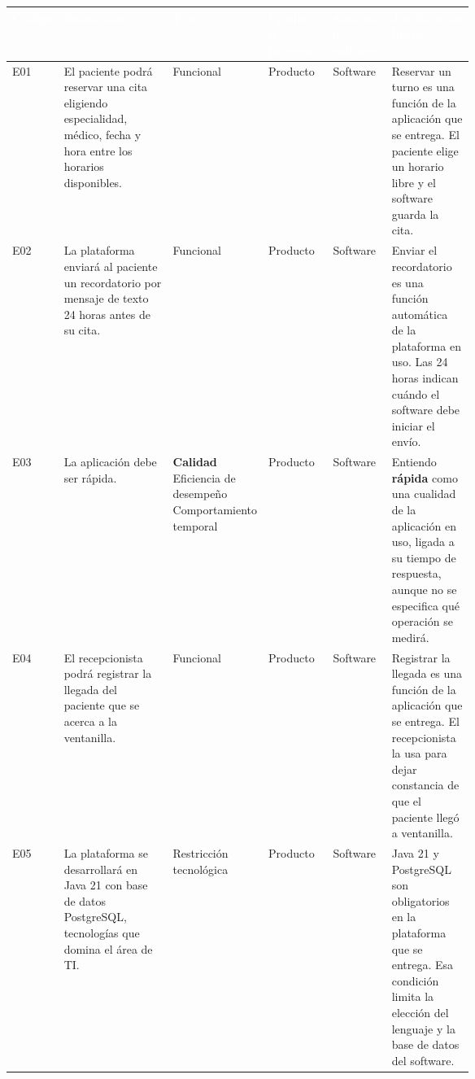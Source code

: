 \documentclass[11pt,a4paper]{article}
\newcommand{\cabeceraTabla}[1]{\textcolor{white}{\textbf{#1}}}
\begin{document}
{\small
\setlength{\tabcolsep}{4pt}
\renewcommand{\arraystretch}{1.1}
\begin{longtable}
  {|>{\raggedright\arraybackslash}p{0.07\linewidth}
   |>{\raggedright\arraybackslash}p{0.24\linewidth}
   |>{\raggedright\arraybackslash}p{0.155\linewidth}
   |>{\raggedright\arraybackslash}p{0.095\linewidth}
   |>{\raggedright\arraybackslash}p{0.10\linewidth}
   |>{\raggedright\arraybackslash}p{}|}
  \hline
  \rowcolor{VerdeTabla}
  \cabeceraTabla{Código} & \cabeceraTabla{Enunciado} & \cabeceraTabla{Tipo} &
  \cabeceraTabla{Producto o proceso} & \cabeceraTabla{Sistema o software} &
  \cabeceraTabla{Justificación breve} \\ \hline
  \endhead

  E01 & El paciente podrá reservar una cita eligiendo especialidad, médico,
  fecha y hora entre los horarios disponibles.
  & Funcional & Producto & Software &
  Reservar un turno es una función de la aplicación que se entrega. El
  paciente elige un horario libre y el software guarda la cita. \\ \hline

  \rowcolor{gray!12}
  E02 & La plataforma enviará al paciente un recordatorio por mensaje de texto
  24 horas antes de su cita.
  & Funcional & Producto & Software &
  Enviar el recordatorio es una función automática de la plataforma en uso.
  Las 24 horas indican cuándo el software debe iniciar el envío. \\ \hline

  E03 & La aplicación debe ser rápida.
  & \textbf{Calidad}\newline
  Eficiencia de desempeño\newline
  Comportamiento temporal
  & Producto & Software &
  Entiendo \textbf{rápida} como una cualidad de la aplicación en uso, ligada
  a su tiempo de respuesta, aunque no se especifica qué operación se medirá.
  \\ \hline

  \rowcolor{gray!12}
  E04 & El recepcionista podrá registrar la llegada del paciente que se acerca
  a la ventanilla.
  & Funcional & Producto & Software &
  Registrar la llegada es una función de la aplicación que se entrega. El
  recepcionista la usa para dejar constancia de que el paciente llegó a
  ventanilla. \\ \hline

  E05 & La plataforma se desarrollará en Java 21 con base de datos PostgreSQL,
  tecnologías que domina el área de TI.
  & Restricción tecnológica & Producto & Software &
  Java 21 y PostgreSQL son obligatorios en la plataforma que se entrega. Esa
  condición limita la elección del lenguaje y la base de datos del software. \\ \hline


\end{longtable}}
\end{document}
